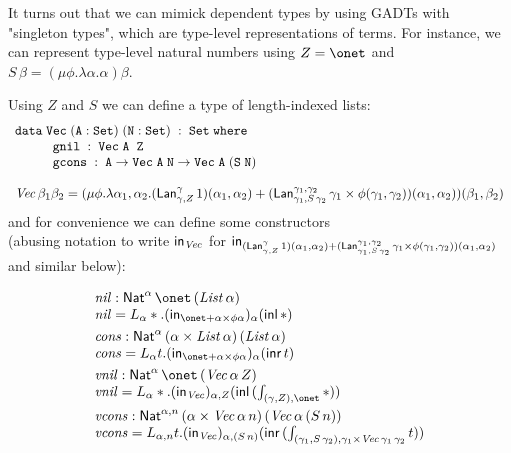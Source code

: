 \documentclass[acmsmall,review,anonymous]{acmart}
\theoremstyle{definition}
\begin{document}
It turns out that we can mimick dependent types by using GADTs with "singleton types", 
which are type-level representations of terms. For instance, we can 
represent type-level natural numbers using $Z = \onet$ and 
$S \, \beta = (\mu \phi. \lambda \alpha. \alpha) \beta$.

Using $Z$ and $S$ we can define a type of length-indexed lists:
\[\begin{array}{l}
  \mathtt{data\; Vec\;(A : Set)\;(N : Set)\;:\;Set\;where}\\
  \hspace*{0.4in}\mathtt{gnil\;:\; Vec\;A\;\;Z}\\
  \hspace*{0.4in}\mathtt{gcons\;:\; A \rightarrow 
      Vec\;A\;N \rightarrow Vec\;A\;(S\;N)}  \\ \\

\mathit{Vec} \, \beta_1 \beta_2 = 
  (\mu \phi. \lambda \alpha_1, \alpha_2. 
    (\mathsf{Lan}^\gamma_{\gamma, Z} \, 1)(\alpha_1, \alpha_2)
  + (\mathsf{Lan}^{\gamma_1,\gamma_2}_{\gamma_1, S\,\gamma_2}
        \,\gamma_1 \times \phi (\gamma_1, \gamma_2))(\alpha_1, \alpha_2)
        )(\beta_1, \beta_2)
\end{array}\]
and for convenience we can define some constructors \\(abusing notation to write
$\mathsf{in}_{\mathit{Vec}}$ for $\mathsf{in}_{
    (\mathsf{Lan}^\gamma_{\gamma, Z} \, 1)(\alpha_1, \alpha_2)
  + (\mathsf{Lan}^{\gamma_1,\gamma_2}_{\gamma_1, S\,\gamma_2}
        \,\gamma_1 \times \phi (\gamma_1, \gamma_2))(\alpha_1, \alpha_2)}$ and similar below):

\[\begin{array}{l}
  \mathit{nil}: \Nat^\alpha \, \onet \, (\mathit{List}\,\alpha) \\
  \vspace{0.05in}
  \mathit{nil} = L_\alpha \ast. (\tin_{\onet + \alpha \times \phi\alpha})_\alpha (\inl \, \ast) \\
  \mathit{cons} : \Nat^\alpha \, (\alpha \times \mathit{List}\,\alpha)\, (\mathit{List} \,\alpha) \\
  \vspace{0.05in}
  \mathit{cons} = L_\alpha t. (\tin_{\onet + \alpha \times \phi\alpha})_\alpha (\inr \, t) \\
  \mathit{vnil} : \Nat^\alpha \, \onet \, (\mathit{Vec} \,\alpha \,Z) \\
  \vspace{0.05in}
  \mathit{vnil} = L_\alpha \ast. (\tin_{\mathit{Vec}})_{\alpha, Z} (\inl \,(\int_{(\gamma, Z), \onet} \ast)) \\
  \mathit{vcons} : \Nat^{\alpha, n} \, (\alpha \times \mathit{Vec} \, \alpha \, n)\, (\mathit{Vec} \, \alpha\,(S\,n)) \\
  \mathit{vcons} = L_{\alpha, n} t. (\tin_{\mathit{Vec}})_{\alpha, (S \,n)} (\inr\, (\int_{(\gamma_1, S\,\gamma_2), \gamma_1 \times \mathit{Vec} \, \gamma_1\,\gamma_2} t))
\end{array}\]
\end{document}

